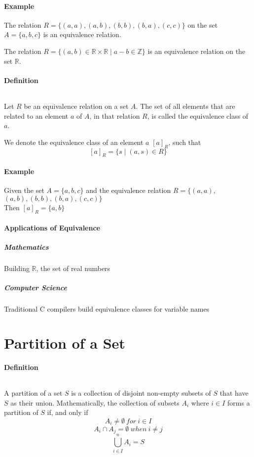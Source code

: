 \documentclass[10pt,a4paper]{book}
\newcommand{\R}{\mathbb{R}}
\begin{document}
\paragraph*{Example}
The relation $R = \{(a,a),(a,b),(b,b),(b,a),(c,c)\}$ on the set $A = \{a,b,c\}$ is an equivalence relation.\par
The relation $R = \{(a,b) \in \R \times \R \mid a - b \in \mathbb{Z}\}$ is an equivalence relation on the set $\mathbb{R}$.
\paragraph*{Definition}
$\ $\par
Let $R$ be an equivalence relation on a set $A$. The set of all elements that are related to an element $a$ of $A$, in that relation $R$, is called the equivalence class of $a$.\par
We denote the equivalence class of an element $a$  $[a]_R$, such that \[[a]_R = \{s \mid (a,s) \in R\}\]
\paragraph*{Example}
Given the set $A = \{a,b,c\}$ and the equivalence relation $R = \{(a,a),$\\$(a,b),(b,b),(b,a),(c,c)\}$\\
Then $[a]_R = \{a,b\}$
\paragraph*{Applications of Equivalence}
\subparagraph*{Mathematics}
Building $\mathbb{R}$, the set of real numbers
\subparagraph*{Computer Science}
Traditional C compilers build equivalence classes for variable names

\section{Partition of a Set}
\paragraph*{Definition}
$\ $\par
A partition of a set $S$ is a collection of disjoint non-empty subsets of $S$ that have $S$ as their union. Mathematically, the collection of subsets $A_i$ where $i \in I$ forms a partition of $S$ if, and only if 
\[A_{i} \neq \emptyset \ for \  i \in I\]
\[A_{i} \cap A_j = \emptyset \  when \ i \neq j\]
\[\bigcup_{i \in I}^{n} A_{i} = S\]
\end{document}
